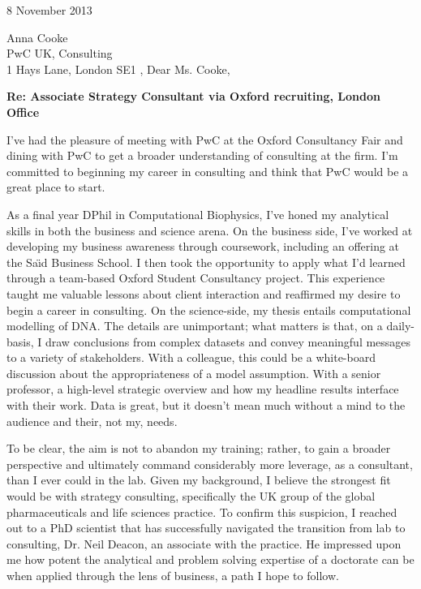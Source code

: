 \documentclass[a4paper]{../res}
\begin{document}
 
\begin{sloppypar}
 
%


\begin{resume} 

8 November 2013

Anna Cooke \\
PwC UK, Consulting \\
1 Hays Lane, London SE1 , 
Dear Ms. Cooke,

\textbf{Re: Associate Strategy Consultant via Oxford recruiting, London Office}

I've had the pleasure of meeting with PwC at the Oxford Consultancy Fair and dining with PwC to get a broader understanding of consulting at the firm. I'm committed to beginning my career in consulting and think that PwC would be a great place to start. 

As a final year DPhil in Computational Biophysics, I've honed my analytical skills in both the business and science arena. On the business side, I've worked at developing my business awareness through coursework, including an offering at the Sa\"\i d Business School. I then took the opportunity to apply what I'd learned through a team-based Oxford Student Consultancy project. This experience taught me valuable lessons about client interaction and reaffirmed my desire to begin a career in consulting. On the science-side, my thesis entails computational modelling of DNA. The details are unimportant; what matters is that, on a daily-basis, I draw conclusions from complex datasets and convey meaningful messages to a variety of stakeholders. With a colleague, this could be a white-board discussion about the appropriateness of a model assumption. With a senior professor, a high-level strategic overview and how my headline results interface with their work. Data is great, but it doesn't mean much without a mind to the audience and their, not my, needs. 

To be clear, the aim is not to abandon my training; rather, to gain a broader perspective and ultimately command considerably more leverage, as a consultant, than I ever could in the lab. Given my background, I believe the strongest fit would be with strategy consulting, specifically the UK group of the global pharmaceuticals and life sciences practice. To confirm this suspicion, I reached out to a PhD scientist that has successfully navigated the transition from lab to consulting, Dr. Neil Deacon, an associate with the practice. He impressed upon me how potent the analytical and problem solving expertise of a doctorate can be when applied through the lens of business, a path I hope to follow. 



\end{resume}
\end{sloppypar}
\end{document}
